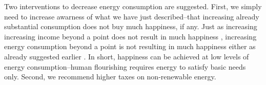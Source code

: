 \documentclass[10pt, letterpaper]{article}
\begin{document}
\begin{spacing}{1.4}

Two interventions to decrease energy consumption are suggested. First, we simply
need to increase awarness of what we have just described--that increasing
already substantial consumption does not buy much happiness, if any. Just as increasing increasing income
 beyond a point does not result in much happiness \cite{kahneman10}, increasing energy consumption beyond a point is not resulting in much happiness
 either as already suggested earlier \cite{mazur74, mazur11}. In short, happiness can be achieved at low
 levels of energy consumption--human flourishing requires energy to satisfy
 basic needs only. Second, we recommend higher taxes on non-renewable energy. 


\end{spacing}
\end{document}
